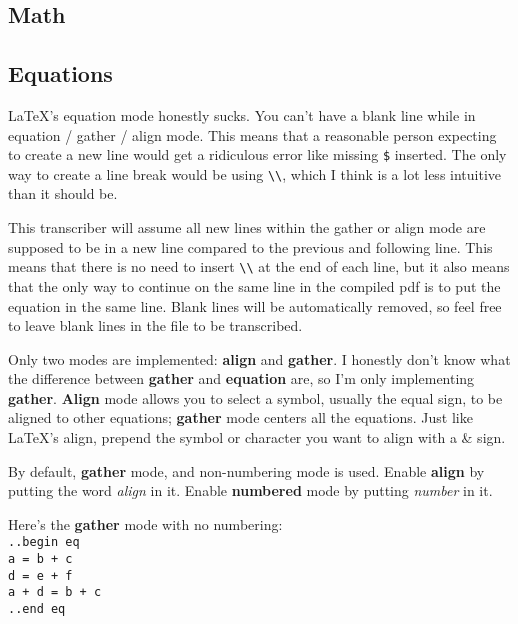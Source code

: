 \documentclass[12pt]{article}
\newcommand{\ital}{\emph}
\newcommand{\nl}{\\}
\renewcommand\bold{\textbf}
\numberwithin{equation}{section}
\begin{document}
\begin{flushleft}
\newpage

\section{Math}

\subsection{Equations}

LaTeX's equation mode honestly sucks. You can't have a blank line while in equation / gather / align mode. This means that a reasonable person expecting to create a new line would get a ridiculous error like missing \verb|$| inserted. The only way to create a line break would be using \verb|\\|, which I think is a lot less intuitive than it should be.

\medskip

This transcriber will assume all new lines within the gather or align mode are supposed to be in a new line compared to the previous and following line. This means that there is no need to insert \verb|\\| at the end of each line, but it also means that the only way to continue on the same line in the compiled pdf is to put the equation in the same line. Blank lines will be automatically removed, so feel free to leave blank lines in the file to be transcribed.

\medskip

Only two modes are implemented: \bold{align} and \bold{gather}. I honestly don't know what the difference between \bold{gather} and \bold{equation} are, so I'm only implementing \bold{gather}. \bold{Align} mode allows you to select a symbol, usually the equal sign, to be aligned to other equations; \bold{gather} mode centers all the equations. Just like LaTeX's align, prepend the symbol or character you want to align with a \& sign.

\medskip

By default, \bold{gather} mode, and non-numbering mode is used. Enable \bold{align} by putting the word \ital{align} in it. Enable \bold{numbered} mode by putting \ital{number} in it.

\medskip

\medskip

Here's the \bold{gather} mode with no numbering: \nl
\verb|..begin eq|\nl
\verb|a = b + c|\nl
\verb|d = e + f|\nl
\verb|a + d = b + c|\nl
\verb|..end eq|


\end{flushleft}
\end{document}
